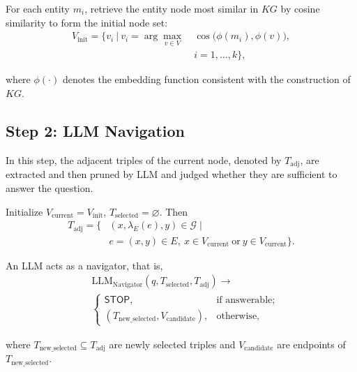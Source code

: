 \documentclass{article}
\theoremstyle{plain}
\theoremstyle{definition}
\theoremstyle{remark}
\begin{document}
For each entity $m_i$, retrieve the entity node most similar in $KG$ by cosine similarity to form the initial node set:
\begin{equation}
\label{euqation1}
\begin{split}
V_{\text{init}}=\Big\{v_i\ \big|\ v_i=\arg\max_{v\in V}\ &\cos\!\big(\phi(m_i),\phi(v)\big),\\
&i=1,\dots,k\Big\},
\end{split}
\end{equation}

where $\phi(\cdot)$ denotes the embedding function consistent with the construction of $KG$.


\subsection{Step 2: LLM Navigation}
In this step, the adjacent triples of the current node, denoted by $T_{\text{adj}}$, are extracted and then pruned by LLM and judged whether they are sufficient to answer the question.

Initialize $V_{\text{current}}=V_{\text{init}}$, $T_{\text{selected}}=\varnothing$. Then
\begin{equation}
\label{euqation2}
\begin{split}
T_{\text{adj}}=\{&(x,\lambda_E(e),y)\in \mathcal{G}\mid \\
&e=(x,y)\in E,\ x\in V_{\text{current}}\ \text{or}\ y\in V_{\text{current}}\}.
\end{split}
\end{equation}

An LLM acts as a navigator, that is,
\begin{equation}
\label{euqation3}
\begin{split}
&\mathrm{LLM_{Navigator}}(q, T_{\text{selected}}, T_{\text{adj}})
\to\\
&\begin{cases}
\textsf{STOP}, &\text{if answerable};\\
(T_{\text{new\_selected}},V_{\text{candidate}}), &\text{otherwise},
\end{cases}
\end{split}
\end{equation}

where $T_{\text{new\_selected}}\subseteq T_{\text{adj}}$ are newly selected triples and $V_{\text{candidate}}$ are endpoints of $T_{\text{new\_selected}}$.
\end{document}
